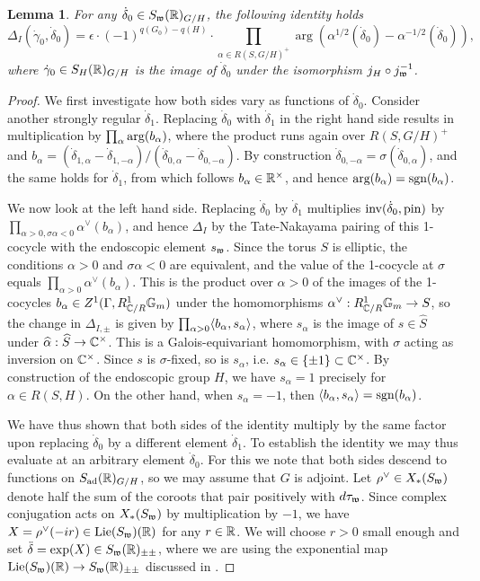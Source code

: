\documentclass{article}
\newtheorem{lem}[thm]{Lemma}
\theoremstyle{definition}
\numberwithin{equation}{section}
\renewcommand{\-}{\hyp{}}
\begin{document}
\begin{lem} \label{lem:magic}
For any $\dot\delta_0 \in S_{\mathfrak{w}}(\mathbb{R})_{G/H}$, the following identity holds
\[  \Delta_{I}(\dot\gamma_0,\dot\delta_0) = \epsilon\cdot(-1)^{q(G_0)-q(H)}\cdot\prod_{\alpha \in R(S,G/H)^+}\arg(\alpha^{1/2}(\dot\delta_0) - \alpha^{-1/2}(\dot\delta_0)), \]
where $\dot\gamma_0 \in S_H(\mathbb{R})_{G/H}$ is the image of $\dot\delta_0$ under the isomorphism $j_H \circ j_{\mathfrak{w}}^{-1}$.
\end{lem}
\begin{proof}
We first investigate how both sides vary as functions of $\dot\delta_0$. Consider another strongly regular $\dot\delta_1$. Replacing $\dot\delta_0$ with $\dot\delta_1$ in the right hand side results in multiplication by $\prod_\alpha \textrm{arg}(b_\alpha)$, where the product runs again over $R(S,G/H)^+$ and $b_\alpha=(\dot\delta_{1,\alpha}-\dot\delta_{1,-\alpha})/(\dot\delta_{0,\alpha}-\dot\delta_{0,-\alpha})$. By construction $\dot\delta_{0,-\alpha}=\sigma(\dot\delta_{0,\alpha})$, and the same holds for $\dot\delta_1$, from which follows $b_\alpha \in \mathbb{R}^\times$, and hence $\textrm{arg}(b_\alpha)=\textrm{sgn}(b_\alpha)$.

We now look at the left hand side. Replacing $\dot\delta_0$ by $\dot\delta_1$ multiplies $\textrm{inv}(\dot\delta_0,\textrm{pin})$ by $\prod_{\alpha>0,\sigma\alpha<0}\alpha^\vee(b_\alpha)$, and hence $\Delta_{I}$ by the Tate-Nakayama pairing of this 1-cocycle with the endoscopic element $s_{\mathfrak{w}}$. Since the torus $S$ is elliptic, the conditions $\alpha>0$ and $\sigma\alpha<0$ are equivalent, and the value of the 1-cocycle at $\sigma$ equals $\prod_{\alpha>0}\alpha^\vee(b_\alpha)$. This is the product over $\alpha>0$ of the images of the 1-cocycles $b_\alpha \in Z^1(\Gamma,R_{\mathbb{C}/R}^1\mathbb{G}_m)$ under the homomorphisms $\alpha^\vee : R_{\mathbb{C}/R}^1\mathbb{G}_m \to S$, so the change in $\Delta_{I,\pm}$ is given by $\prod_{\alpha>0}\langle b_\alpha,s_\alpha\rangle$, where $s_\alpha$ is the image of $s \in \hat S$ under $\widehat\alpha : \widehat S \to \mathbb{C}^\times$. This is a Galois-equivariant homomorphism, with $\sigma$ acting as inversion on $\mathbb{C}^\times$. Since $s$ is $\sigma$-fixed, so is $s_\alpha$, i.e. $s_\alpha \in \{\pm1\} \subset \mathbb{C}^\times$. By construction of the endoscopic group $H$, we have $s_\alpha=1$ precisely for $\alpha \in R(S,H)$. On the other hand, when $s_\alpha=-1$, then $\langle b_\alpha,s_\alpha\rangle=\textrm{sgn}(b_\alpha)$.

We have thus shown that both sides of the identity multiply by the same factor upon replacing $\dot\delta_0$ by a different element $\dot\delta_1$. To establish the identity we may thus evaluate at an arbitrary element $\dot\delta_0$. For this we note that both sides descend to functions on $S_{\textrm{ad}}(\mathbb{R})_{G/H}$, so we may assume that $G$ is adjoint. Let $\rho^\vee \in X_*(S_{\mathfrak{w}})$ denote half the sum of the coroots that pair positively with $d\tau_{\mathfrak{w}}$. Since complex conjugation acts on $X_*(S_{\mathfrak{w}})$ by multiplication by $-1$, we have $X=\rho^\vee(-ir) \in \textrm{Lie}(S_{\mathfrak{w}})(\mathbb{R})$ for any $r \in \mathbb{R}$. We will choose $r>0$ small enough and set $\ddot\delta=\exp(X) \in S_{\mathfrak{w}}(\mathbb{R})_{\pm\pm}$, where we are using the exponential map $\textrm{Lie}(S_{\mathfrak{w}})(\mathbb{R}) \to S_{\mathfrak{w}}(\mathbb{R})_{\pm\pm}$ discussed in \cite[\S3.7]{KalDC}.




\end{proof}
\end{document}
